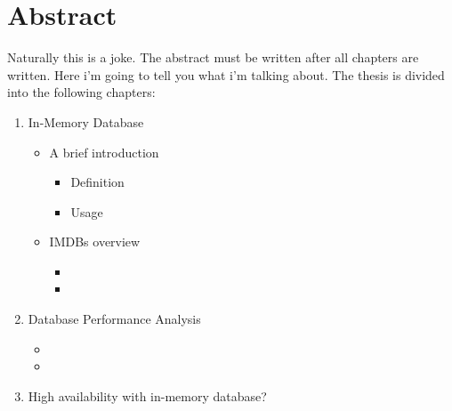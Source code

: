 \chapter{Abstract}
Naturally this is a joke. The abstract must be written after all chapters are written.
Here i'm going to tell you what i'm talking about. The thesis is divided into the following chapters:
\begin{enumerate}
	\item In-Memory Database	
		\begin{itemize}
			\item A brief introduction		
				\begin{itemize}
					\item Definition
					\item Usage
				\end{itemize}
				
			\item IMDBs overview
				\begin{itemize}
					\item 
					\item 
				\end{itemize}
				
		\end{itemize}
	
	\item Database Performance Analysis
		\begin{itemize}
			\item 
			\item 
		\end{itemize}
		
	\item High availability with in-memory database?
\end{enumerate}
